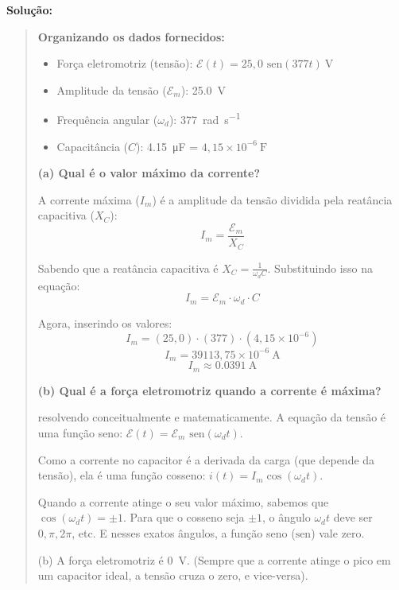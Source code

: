 \documentclass[12pt,a4paper]{article}
\begin{document}
\textbf{Solução:}
\begin{quote}

\noindent \textbf{Organizando os dados fornecidos:}
\begin{itemize}
    \item Força eletromotriz (tensão): $\mathscr{E}(t) = 25,0 \text{ sen}(377t)\ \text{V}$
    \item Amplitude da tensão ($\mathscr{E}_m$): \SI{25,0}{\volt}
    \item Frequência angular ($\omega_d$): \SI{377}{\radian\per\second}
    \item Capacitância ($C$): \SI{4,15}{\micro\farad} = $4,15 \times 10^{-6}\ \text{F}$
\end{itemize}

\vspace{0.4cm}
\noindent \textbf{(a) Qual é o valor máximo da corrente?}

\vspace{0.2cm}
\noindent A corrente máxima ($I_m$) é a amplitude da tensão dividida pela reatância capacitiva ($X_C$):
\[
I_m = \frac{\mathscr{E}_m}{X_C}
\]

\noindent Sabendo que a reatância capacitiva é $X_C = \frac{1}{\omega_d C}$. Substituindo isso na equação:
\[
I_m = \mathscr{E}_m \cdot \omega_d \cdot C
\]

\noindent Agora, inserindo os valores:
\[
I_m = (25,0) \cdot (377) \cdot (4,15 \times 10^{-6})
\]
\[
I_m = 39113,75 \times 10^{-6}\ \text{A}
\]
\[
I_m \approx \SI{0,0391}{\ampere}
\]


\vspace{0.4cm}
\noindent \textbf{(b) Qual é a força eletromotriz quando a corrente é máxima?}

\vspace{0.2cm}
\noindent resolvendo  conceitualmente e matematicamente. A equação da tensão é uma função seno: $\mathscr{E}(t) = \mathscr{E}_m \text{ sen}(\omega_d t)$.

\noindent Como a corrente no capacitor é a derivada da carga (que depende da tensão), ela é uma função cosseno: $i(t) = I_m \cos(\omega_d t)$.

\noindent Quando a corrente atinge o seu valor máximo, sabemos que $\cos(\omega_d t) = \pm 1$. Para que o cosseno seja $\pm 1$, o ângulo $\omega_d t$ deve ser $0, \pi, 2\pi$, etc. E nesses exatos ângulos, a função seno ($\text{sen}$) vale zero.

\noindent (b) A força eletromotriz é \SI{0}{\volt}. (Sempre que a corrente atinge o pico em um capacitor ideal, a tensão cruza o zero, e vice-versa).
\end{quote}
\end{document}
